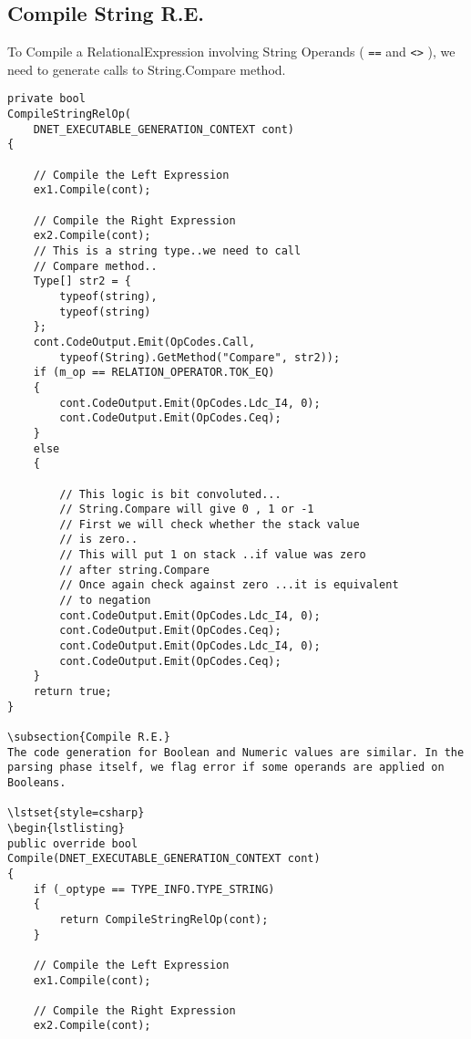 \subsection{Compile String R.E.}
To Compile a RelationalExpression involving String Operands ( \texttt{==} and \texttt{<>} ), we need to generate calls to String.Compare method.
\lstset{style=csharp}
\begin{lstlisting}
private bool 
CompileStringRelOp(
	DNET_EXECUTABLE_GENERATION_CONTEXT cont)
{
	
	// Compile the Left Expression
	ex1.Compile(cont);

	// Compile the Right Expression
	ex2.Compile(cont);
	// This is a string type..we need to call
	// Compare method..
	Type[] str2 = {
		typeof(string),
		typeof(string)
	};
	cont.CodeOutput.Emit(OpCodes.Call,
		typeof(String).GetMethod("Compare", str2));
	if (m_op == RELATION_OPERATOR.TOK_EQ)
	{
		cont.CodeOutput.Emit(OpCodes.Ldc_I4, 0);
		cont.CodeOutput.Emit(OpCodes.Ceq);
	}
	else
	{
	
		// This logic is bit convoluted...
		// String.Compare will give 0 , 1 or -1
		// First we will check whether the stack value
		// is zero..
		// This will put 1 on stack ..if value was zero
		// after string.Compare
		// Once again check against zero ...it is equivalent
		// to negation
		cont.CodeOutput.Emit(OpCodes.Ldc_I4, 0);
		cont.CodeOutput.Emit(OpCodes.Ceq);
		cont.CodeOutput.Emit(OpCodes.Ldc_I4, 0);
		cont.CodeOutput.Emit(OpCodes.Ceq);
	}
	return true;
}

\subsection{Compile R.E.}
The code generation for Boolean and Numeric values are similar. In the parsing phase itself, we flag error if some operands are applied on Booleans.

\lstset{style=csharp}
\begin{lstlisting}
public override bool 
Compile(DNET_EXECUTABLE_GENERATION_CONTEXT cont)
{
	if (_optype == TYPE_INFO.TYPE_STRING)
	{
		return CompileStringRelOp(cont);
	}

	// Compile the Left Expression
	ex1.Compile(cont);

	// Compile the Right Expression
	ex2.Compile(cont);
	

\end{lstlisting}
